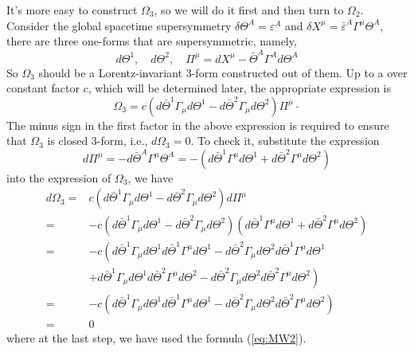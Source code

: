 \documentclass[graybox,envcountchap,sectrefs]{svmono}
\begin{document}
It's more easy to construct $\Omega_3$, so we will do it first and then turn to $\Omega_2$.
Consider the global spacetime supersymmetry $\delta \Theta^A=\varepsilon^A$ and $\delta X^{\mu}=\bar{\varepsilon}^A\Gamma^{\mu}\Theta^A$, there are three one-forms that are supersymmetric, namely,
\begin{equation}
d \Theta^{1}, \quad d \Theta^{2},  \quad \Pi^{\mu}=d X^{\mu}-\bar{\Theta}^{A} \Gamma^{A} d \Theta^{A}
\end{equation}
So $\Omega_{3}$ should be a Lorentz-invariant 3-form constructed out of them. Up to a over constant factor $c$, which will be determined later, the appropriate expression is
\begin{equation}
\Omega_{3}=c\left(d \bar{\Theta}^{1} \Gamma_{\mu} d \Theta^{1}-d \bar{\Theta}^{2} \Gamma_{\mu} d \Theta^{2}\right) \Pi^{\mu} \cdot
\end{equation}
The minus sign in the first factor in the above expression is required to ensure that $\Omega_3$ is closed 3-form, i.e., $d\Omega_3=0$. To check it, substitute the expression
\begin{equation}
d\Pi^{\mu}=-d\bar{\Theta}^A\Gamma^{\mu}\Theta^A	=-\left(d \bar{\Theta}^{1} \Gamma^{\mu} d \Theta^{1}+d \bar{\Theta}^{2} \Gamma^{\mu} d \Theta^{2}\right)
\end{equation}
into the expression of $\Omega_3$, we have
\begin{equation}
\begin{aligned}
d \Omega_{3}=& c\left(d \bar{\Theta}^{1} \Gamma_{\mu} d \Theta^{1}-d \bar{\Theta}^{2} \Gamma_{\mu} d \Theta^{2}\right) d \Pi^{\mu} \\
=&-c\left(d \bar{\Theta}^{1} \Gamma_{\mu} d \Theta^{1}-d \bar{\Theta}^{2} \Gamma_{\mu} d \Theta^{2}\right)\left(d \bar{\Theta}^{1} \Gamma^{\mu} d \Theta^{1}+d \bar{\Theta}^{2} \Gamma^{\mu} d \Theta^{2}\right) \\
=&-c\left(d \bar{\Theta}^{1} \Gamma_{\mu} d \Theta^{1} d \bar{\Theta}^{1} \Gamma^{\mu} d \Theta^{1}-d \bar{\Theta}^{2} \Gamma_{\mu} d \Theta^{2} d \bar{\Theta}^{1} \Gamma^{\mu} d \Theta^{1}\right.\\
&\left.+d \bar{\Theta}^{1} \Gamma_{\mu} d \Theta^{1} d \bar{\Theta}^{2} \Gamma^{\mu} d \Theta^{2}-d \bar{\Theta}^{2} \Gamma_{\mu} d \Theta^{2} d \bar{\Theta}^{2} \Gamma^{\mu} d \Theta^{2}\right) \\
=&-c\left(d \bar{\Theta}^{1} \Gamma_{\mu} d \Theta^{1} d \bar{\Theta}^{1} \Gamma^{\mu} d \Theta^{1}-d \bar{\Theta}^{2} \Gamma_{\mu} d \Theta^{2} d \bar{\Theta}^{2} \Gamma^{\mu} d \Theta^{2}\right)\\
=&0
\end{aligned}
\end{equation}
where at the last step, we have used the formula (\ref{eq:MW2}).
\end{document}
